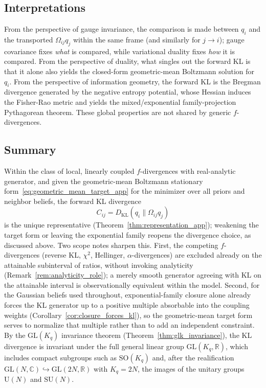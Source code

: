 \documentclass[11pt]{article}
\begin{document}
\subsection*{Interpretations}
From the perspective of gauge invariance, the comparison is made between $q_i$ and the transported $\Omega_{ij}q_j$ within the same frame (and similarly for $j \rightarrow i$); gauge covariance fixes \emph{what} is compared, while variational duality fixes \emph{how} it is compared. From the perspective of duality, what singles out the forward KL is that it alone also yields the closed-form geometric-mean Boltzmann solution for $q_i$. From the perspective of information geometry, the forward KL is the Bregman divergence generated by the negative entropy potential, whose Hessian induces the Fisher-Rao metric and yields the mixed/exponential family-projection Pythagorean theorem. These global properties are not shared by generic $f$-divergences.

\subsection*{Summary}
Within the class of local, linearly coupled $f$-divergences with real-analytic generator, and given the geometric-mean Boltzmann stationary form~\eqref{eq:geometric_mean_target_app} for the minimizer over all priors and neighbor beliefs, the forward KL divergence
\[
\boxed{
C_{ij}=D_{\mathrm{KL}}(q_i \| \Omega_{ij} q_j)}
\]
is the unique representative (Theorem~\ref{thm:representation_app}); weakening the target form or leaving the exponential family reopens the divergence choice, as discussed above. Two scope notes sharpen this. First, the competing $f$-divergences (reverse KL, $\chi^2$, Hellinger, $\alpha$-divergences) are excluded already on the attainable subinterval of ratios, without invoking analyticity (Remark~\ref{rem:analyticity_role}); a merely smooth generator agreeing with KL on the attainable interval is observationally equivalent within the model. Second, for the Gaussian beliefs used throughout, exponential-family closure alone already forces the KL generator up to a positive multiple absorbable into the coupling weights (Corollary~\ref{cor:closure_forces_kl}), so the geometric-mean target form serves to normalize that multiple rather than to add an independent constraint. By the $\mathrm{GL}(K_q)$ invariance theorem (Theorem~\ref{thm:glk_invariance}), the KL divergence is invariant under the full general linear group $\mathrm{GL}(K_q, \mathbb{R})$, which includes compact subgroups such as $\mathrm{SO}(K_q)$ and, after the realification $\mathrm{GL}(N, \mathbb{C}) \hookrightarrow \mathrm{GL}(2N, \mathbb{R})$ with $K_q = 2N$, the images of the unitary groups $\mathrm{U}(N)$ and $\mathrm{SU}(N)$.
\end{document}
